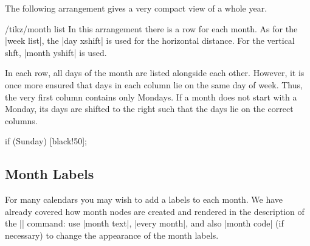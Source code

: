 The following arrangement gives a very compact view of a whole year.
\begin{stylekey}{/tikz/month list}
  In this arrangement there is a row for each month. As for the
  |week list|, the |day xshift| is used for the horizontal distance.
  For the vertical shft, |month yshift| is used.

  In each row, all days of the month are listed alongside each
  other. However, it is once more ensured that days in each column lie
  on the same day of week. Thus, the very first column contains only
  Mondays. If a month does not start with a Monday, its days are
  shifted to the right such that the days lie on the correct columns. 
\begin{codeexample}[]
\sffamily\scriptsize    
\tikz
  \calendar [dates=2000-01-01 to 2000-12-31,
             month list,month label left,month yshift=1.25em]
            if (Sunday) [black!50];
\end{codeexample}
\end{stylekey}

\subsection{Month Labels}

For many calendars you may wish to add a labels to each month. We have
already covered how month nodes are created and rendered in the
description of the |\calendar| command: use |month text|,
|every month|, and also |month code| (if necessary) to change the
appearance of the month labels.

